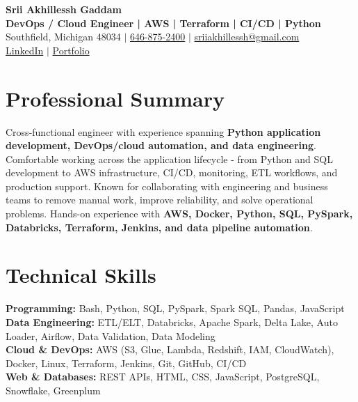 \documentclass[letterpaper,10pt]{article}
\begin{document}
\fontsize{9.35pt}{10.45pt}\selectfont

\begin{center}
    {\LARGE \textbf{Srii Akhillessh Gaddam}} \\[-1pt]
    \textbf{DevOps / Cloud Engineer | AWS | Terraform | CI/CD | Python} \\[2pt]
    Southfield, Michigan 48034 $|$
    \href{tel:6468752400}{646-875-2400} $|$
    \href{mailto:sriiakhillessh@gmail.com}{sriiakhillessh@gmail.com} \\[1pt]
    \href{https://www.linkedin.com/in/srii-akhiilessh-gaddam-b48668191/}{LinkedIn} $|$
    \href{https://sriiakhillesshg.github.io/portfolio/}{Portfolio}
\end{center}
\vspace{-8pt}

\section{Professional Summary}
\small{Cross-functional engineer with experience spanning \textbf{Python application development, DevOps/cloud automation, and data engineering}. Comfortable working across the application lifecycle - from Python and SQL development to AWS infrastructure, CI/CD, monitoring, ETL workflows, and production support. Known for collaborating with engineering and business teams to remove manual work, improve reliability, and solve operational problems. Hands-on experience with \textbf{AWS, Docker, Python, SQL, PySpark, Databricks, Terraform, Jenkins, and data pipeline automation}.}

\section{Technical Skills}
\small{
\textbf{Programming:} Bash, Python, SQL, PySpark, Spark SQL, Pandas, JavaScript \\
\textbf{Data Engineering:} ETL/ELT, Databricks, Apache Spark, Delta Lake, Auto Loader, Airflow, Data Validation, Data Modeling \\
\textbf{Cloud \& DevOps:} AWS (S3, Glue, Lambda, Redshift, IAM, CloudWatch), Docker, Linux, Terraform, Jenkins, Git, GitHub, CI/CD \\
\textbf{Web \& Databases:} REST APIs, HTML, CSS, JavaScript, PostgreSQL, Snowflake, Greenplum
}
\end{document}
